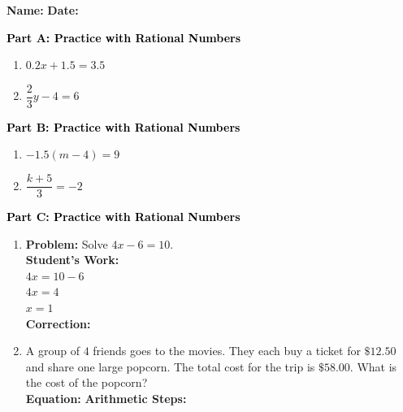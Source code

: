 \documentclass[12pt, letterpaper, fleqn]{article}
\newcommand{\blanklong}{\underline{\hspace{6.5cm}}}
\begin{document}
\textbf{Name:} \underline{\hspace{5cm}}
\hfill
\textbf{Date:} \underline{\hspace{3cm}}\\

\begin{tcolorbox}[colback=customteal!20]
\large\textcolor{black}{\textbf{Part A: Practice with Rational Numbers}}
\end{tcolorbox}

\vspace{3mm}

\begin{enumerate}[itemsep=4.2cm, leftmargin=0.6cm]
\item $0.2x + 1.5 = 3.5$
\item $\dfrac{2}{3}y - 4 = 6$
\end{enumerate}

\newpage

\begin{tcolorbox}[colback=customteal!20]
\large\textcolor{black}{\textbf{Part B: Practice with Rational Numbers}}
\end{tcolorbox}

\vspace{3mm}

\begin{enumerate}[itemsep=4.2cm, leftmargin=0.6cm, resume]
\item $-1.5(m - 4) = 9$
\item $\dfrac{k + 5}{3} = -2$
\end{enumerate}

\newpage

\begin{tcolorbox}[colback=customteal!20]
\large\textcolor{black}{\textbf{Part C: Practice with Rational Numbers}}
\end{tcolorbox}

\vspace{3mm}

\begin{enumerate}[itemsep=4.2cm, leftmargin=0.6cm, resume]
\item \textbf{Problem:} Solve $4x - 6 = 10$.\\
\textbf{Student's Work:} \\
$4x = 10 - 6$\\
$4x = 4$\\
$x = 1$\\
\textbf{Correction:}
\item A group of $4$ friends goes to the movies. They each buy a ticket for $\$12.50$ and share one large popcorn. The total cost for the trip is $\$58.00$. What is the cost of the popcorn?\\
\textbf{Equation:} \blanklong \hspace{1cm} \textbf{Arithmetic Steps:}\\
\end{enumerate}
\end{document}
